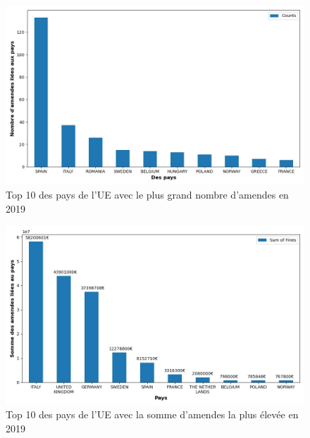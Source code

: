 \documentclass[french]{article}
\begin{document}
	\begin{figure}
		[H]\centering\includegraphics[scale=.5]{graphs/top10_countries_year}
		\caption{Top 10 des pays de l'UE avec le plus grand nombre d'amendes en 2019}
	\end{figure}
	\begin{figure}
		[H]\centering\includegraphics[scale=.5]{graphs/top10_countries_year_fines}
		\caption{Top 10 des pays de l'UE avec la somme d'amendes la plus élevée en 2019}
	\end{figure}
\end{document}

